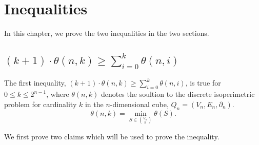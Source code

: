 \documentclass[12pt]{ucthesis}
\theoremstyle{plain}
\theoremstyle{definition}
\begin{document}
\chapter{Inequalities}
\label{Chapter 4}

In this chapter, we prove the two inequalities in the two sections.

\section{
  \texorpdfstring{
    $(k + 1) \cdot \theta(n, k) \ge \sum_{i = 0}^k \theta(n, i)$
  }{
    (k + 1) theta(n, k) >= sum_\{i = 0\}\{k\} theta(n, i)
  }
}
\label{Section 4.1}

The first inequality, $(k + 1) \cdot \theta(n, k) \ge \sum_{i = 0}^k \theta(n, i)$,
is true for $0 \le k \le 2^{n - 1}$,
where $\theta(n, k)$ denotes the soultion to the discrete isoperimetric problem
for cardinality $k$ in the $n$-dimensional cube, $Q_n = (V_n, E_n, \partial_n)$.
\begin{equation*}
\theta(n, k) = \min_{S \in \binom{V_n}{k}} \theta(S).
\end{equation*}

We first prove two claims which will be used to prove the inequality.
\end{document}
